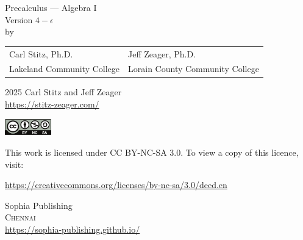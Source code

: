 \frontmatter



\begin{titlepage}
\begin{center}

\vspace*{0.1\paperheight}

\Huge Precalculus --- Algebra I  \\ \vspace{.1in} \large Version $4 - \epsilon$  \\ \vspace{.25in} \large by

\vspace{0.1\paperheight}

\begin{tabularx}{0.953\linewidth}{YY} Carl Stitz, Ph.D. &  Jeff Zeager, Ph.D. \\ Lakeland Community College & Lorain County Community College \\\end{tabularx}

\vfill

\begin{center}
    \sophia
\end{center}

\end{center}
\end{titlepage}

\begingroup
\footnotesize
\setlength{\parindent}{0pt}
\setlength{\parskip}{\baselineskip}

\textcopyright{} 2025 Carl Stitz and Jeff Zeager \\
\url{https://stitz-zeager.com/}

\includegraphics[height=20pt]{../by-nc-sa.pdf}

This work is licensed under CC BY-NC-SA 3.0. To view a copy of this licence,
visit:

\url{https://creativecommons.org/licenses/by-nc-sa/3.0/deed.en}

\vfill

Sophia Publishing \\
\textsc{Chennai} \\
\url{https://sophia-publishing.github.io/} \\
\endgroup

